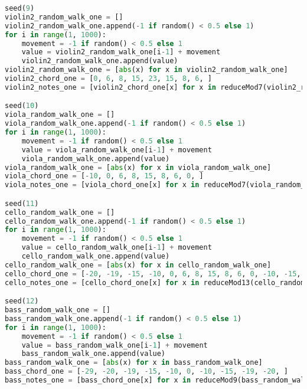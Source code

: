 \begin{lstlisting}[language=Python, caption=Tianshu Segment\_III]
seed(9)
violin2_random_walk_one = []
violin2_random_walk_one.append(-1 if random() < 0.5 else 1)
for i in range(1, 1000):
    movement = -1 if random() < 0.5 else 1
    value = violin2_random_walk_one[i-1] + movement
    violin2_random_walk_one.append(value)
violin2_random_walk_one = [abs(x) for x in violin2_random_walk_one]
violin2_chord_one = [0, 6, 8, 15, 23, 15, 8, 6, ]
violin2_notes_one = [violin2_chord_one[x] for x in reduceMod7(violin2_random_walk_one)]

seed(10)
viola_random_walk_one = []
viola_random_walk_one.append(-1 if random() < 0.5 else 1)
for i in range(1, 1000):
    movement = -1 if random() < 0.5 else 1
    value = viola_random_walk_one[i-1] + movement
    viola_random_walk_one.append(value)
viola_random_walk_one = [abs(x) for x in viola_random_walk_one]
viola_chord_one = [-10, 0, 6, 8, 15, 8, 6, 0, ]
viola_notes_one = [viola_chord_one[x] for x in reduceMod7(viola_random_walk_one)]

seed(11)
cello_random_walk_one = []
cello_random_walk_one.append(-1 if random() < 0.5 else 1)
for i in range(1, 1000):
    movement = -1 if random() < 0.5 else 1
    value = cello_random_walk_one[i-1] + movement
    cello_random_walk_one.append(value)
cello_random_walk_one = [abs(x) for x in cello_random_walk_one]
cello_chord_one = [-20, -19, -15, -10, 0, 6, 8, 15, 8, 6, 0, -10, -15, -19, ]
cello_notes_one = [cello_chord_one[x] for x in reduceMod13(cello_random_walk_one)]

seed(12)
bass_random_walk_one = []
bass_random_walk_one.append(-1 if random() < 0.5 else 1)
for i in range(1, 1000):
    movement = -1 if random() < 0.5 else 1
    value = bass_random_walk_one[i-1] + movement
    bass_random_walk_one.append(value)
bass_random_walk_one = [abs(x) for x in bass_random_walk_one]
bass_chord_one = [-29, -20, -19, -15, -10, 0, -10, -15, -19, -20, ]
bass_notes_one = [bass_chord_one[x] for x in reduceMod9(bass_random_walk_one)]


\end{lstlisting}
